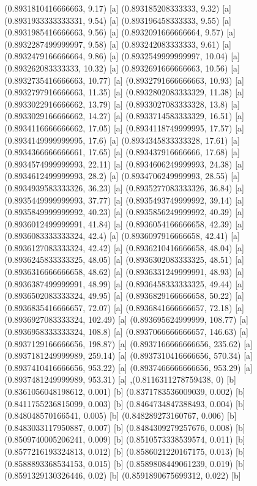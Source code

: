 {{{(0.8931810416666663, 9.17) [a] 
(0.893185208333333, 9.32) [a] 
(0.8931933333333331, 9.54) [a] 
(0.893196458333333, 9.55) [a] 
(0.8931985416666663, 9.56) [a] 
(0.8932091666666664, 9.57) [a] 
(0.8932287499999997, 9.58) [a] 
(0.893242083333333, 9.61) [a] 
(0.8932479166666664, 9.86) [a] 
(0.8932549999999997, 10.04) [a] 
(0.893262083333333, 10.32) [a] 
(0.8932691666666663, 10.56) [a] 
(0.8932735416666663, 10.77) [a] 
(0.8932791666666663, 10.93) [a] 
(0.8932797916666663, 11.35) [a] 
(0.8932802083333329, 11.38) [a] 
(0.8933022916666662, 13.79) [a] 
(0.8933027083333328, 13.8) [a] 
(0.8933029166666662, 14.27) [a] 
(0.8933714583333329, 16.51) [a] 
(0.8934116666666662, 17.05) [a] 
(0.8934118749999995, 17.57) [a] 
(0.8934149999999995, 17.6) [a] 
(0.8934345833333328, 17.61) [a] 
(0.8934366666666661, 17.65) [a] 
(0.893437916666666, 17.68) [a] 
(0.8934574999999993, 22.11) [a] 
(0.8934606249999993, 24.38) [a] 
(0.8934612499999993, 28.2) [a] 
(0.8934706249999993, 28.55) [a] 
(0.8934939583333326, 36.23) [a] 
(0.8935277083333326, 36.84) [a] 
(0.8935449999999993, 37.77) [a] 
(0.8935493749999992, 39.14) [a] 
(0.8935849999999992, 40.23) [a] 
(0.8935856249999992, 40.39) [a] 
(0.8936012499999991, 41.84) [a] 
(0.8936054166666658, 42.39) [a] 
(0.8936083333333324, 42.4) [a] 
(0.8936097916666658, 42.41) [a] 
(0.8936127083333324, 42.42) [a] 
(0.8936210416666658, 48.04) [a] 
(0.8936245833333325, 48.05) [a] 
(0.8936302083333325, 48.51) [a] 
(0.8936316666666658, 48.62) [a] 
(0.8936331249999991, 48.93) [a] 
(0.8936387499999991, 48.99) [a] 
(0.8936458333333325, 49.44) [a] 
(0.8936502083333324, 49.95) [a] 
(0.8936829166666658, 50.22) [a] 
(0.8936835416666657, 72.07) [a] 
(0.8936841666666657, 72.18) [a] 
(0.8936927083333324, 102.49) [a] 
(0.893695624999999, 108.77) [a] 
(0.8936958333333324, 108.8) [a] 
(0.8937066666666657, 146.63) [a] 
(0.8937129166666656, 198.87) [a] 
(0.8937166666666656, 235.62) [a] 
(0.8937181249999989, 259.14) [a] 
(0.8937310416666656, 570.34) [a] 
(0.8937410416666656, 953.22) [a] 
(0.8937466666666656, 953.29) [a] 
(0.8937481249999989, 953.31) [a] 
},{(0.8116311278759438, 0) [b] 
(0.8361056048198612, 0.001) [b] 
(0.8371783536009039, 0.002) [b] 
(0.8411755236815099, 0.003) [b] 
(0.8464734847388493, 0.004) [b] 
(0.848048570166541, 0.005) [b] 
(0.848289273160767, 0.006) [b] 
(0.8483033117950887, 0.007) [b] 
(0.8484309279257676, 0.008) [b] 
(0.8509740005206241, 0.009) [b] 
(0.8510573338539574, 0.011) [b] 
(0.8577216193324813, 0.012) [b] 
(0.8586021220167175, 0.013) [b] 
(0.8588893368534153, 0.015) [b] 
(0.8589808449061239, 0.019) [b] 
(0.8591329130326446, 0.02) [b] 
(0.8591890675699312, 0.022) [b] 
}}}
